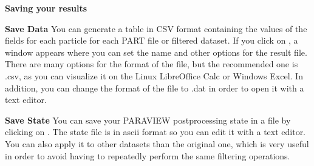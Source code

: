 \documentclass{../GPUSPHtemplate}
\begin{document}
\textbf{Saving your results}

\textbf{Save Data}
You can generate a table in CSV format containing the values of the 
fields for each particle for each PART file or filtered dataset. 
If you click on , a window appears where 
you can set the name and other options for the result file. 
There are many options for the format of the file, but the recommended 
one is .csv, as you can visualize it on the Linux LibreOffice Calc 
or Windows Excel. In addition, 
you can change the format of the file to .dat in order to open 
it with a text editor. 

\textbf{Save State}
You can save your PARAVIEW postprocessing state in a file by
clicking on . The state file is in ascii
format so you can edit it with a text editor.
You can also apply it to other datasets than the original one, 
which is very useful in order to avoid having to repeatedly
perform the same filtering operations.

%
\end{document}
